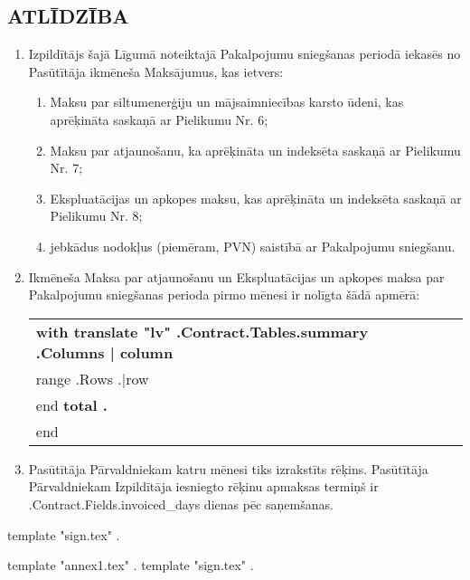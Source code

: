 \subsection{ATLĪDZĪBA}
\begin{enumerate}
	\item Izpildītājs šajā Līgumā noteiktajā Pakalpojumu sniegšanas periodā iekasēs no Pasūtītāja ikmēneša Maksājumus, kas ietvers:
	\begin{enumerate}
		\item Maksu par siltumenerģiju un mājsaimniecības karsto ūdeni, kas aprēķināta saskaņā ar Pielikumu Nr.  6;
		\item Maksu par atjaunošanu, ka aprēķināta un indeksēta saskaņā ar Pielikumu Nr.  7;
		\item Ekspluatācijas un apkopes maksu, kas aprēķināta un indeksēta saskaņā ar Pielikumu Nr.  8;
		\item jebkādus nodokļus (piemēram, PVN) saistībā ar Pakalpojumu sniegšanu.
	\end{enumerate}
	\item Ikmēneša Maksa par atjaunošanu un Ekspluatācijas un apkopes maksa par Pakalpojumu sniegšanas perioda pirmo mēnesi ir nolīgta šādā apmērā:


\begin{center}
	\begin{tabu}{|X|X|X|X|}\tabucline{}\rowfont[c]\bfseries
	{{with translate "lv" .Contract.Tables.summary}} %
	{{.Columns | column}} \\\tabucline{}
	{{range .Rows}} %
	{{.|row}} \\\tabucline{}
	{{end}}
	\bfseries {{total .}} \\\tabucline{} %
	{{end}}
	\end{tabu}
\end{center}

\item Pasūtītāja Pārvaldniekam katru mēnesi tiks izrakstīts rēķins. Pasūtītāja Pārvaldniekam Izpildītāja iesniegto rēķinu apmaksas termiņš ir \iffalse input fields.invoiced_days value="{{.Contract.Fields.invoiced_days}}" type="number" \fi {{.Contract.Fields.invoiced_days}} dienas pēc saņemšanas.
\end{enumerate}

\vspace{2cm}
{{template "sign.tex" .}} %

{{template "annex1.tex" .}} %
{{template "sign.tex" .}} %


